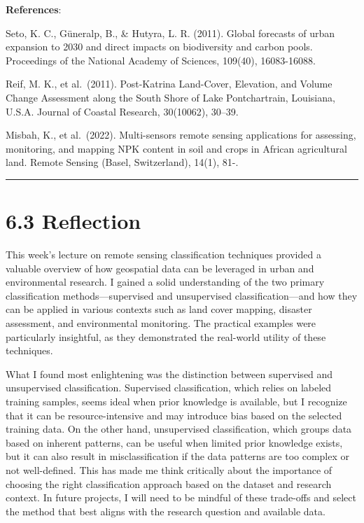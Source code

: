 \documentclass[
  letterpaper,
  DIV=11,
  numbers=noendperiod]{scrreprt}
\begin{document}
\textbf{References}:

Seto, K. C., Güneralp, B., \& Hutyra, L. R. (2011). Global forecasts of
urban expansion to 2030 and direct impacts on biodiversity and carbon
pools. Proceedings of the National Academy of Sciences, 109(40),
16083-16088.

Reif, M. K., et al.~(2011). Post-Katrina Land-Cover, Elevation, and
Volume Change Assessment along the South Shore of Lake Pontchartrain,
Louisiana, U.S.A. Journal of Coastal Research, 30(10062), 30--39.

Misbah, K., et al.~(2022). Multi-sensors remote sensing applications for
assessing, monitoring, and mapping NPK content in soil and crops in
African agricultural land. Remote Sensing (Basel, Switzerland), 14(1),
81-.

\begin{center}\rule{0.5\linewidth}{0.5pt}\end{center}

\section{6.3 Reflection}\label{reflection-4}

This week's lecture on remote sensing classification techniques provided
a valuable overview of how geospatial data can be leveraged in urban and
environmental research. I gained a solid understanding of the two
primary classification methods---supervised and unsupervised
classification---and how they can be applied in various contexts such as
land cover mapping, disaster assessment, and environmental monitoring.
The practical examples were particularly insightful, as they
demonstrated the real-world utility of these techniques.

What I found most enlightening was the distinction between supervised
and unsupervised classification. Supervised classification, which relies
on labeled training samples, seems ideal when prior knowledge is
available, but I recognize that it can be resource-intensive and may
introduce bias based on the selected training data. On the other hand,
unsupervised classification, which groups data based on inherent
patterns, can be useful when limited prior knowledge exists, but it can
also result in misclassification if the data patterns are too complex or
not well-defined. This has made me think critically about the importance
of choosing the right classification approach based on the dataset and
research context. In future projects, I will need to be mindful of these
trade-offs and select the method that best aligns with the research
question and available data.
\end{document}
